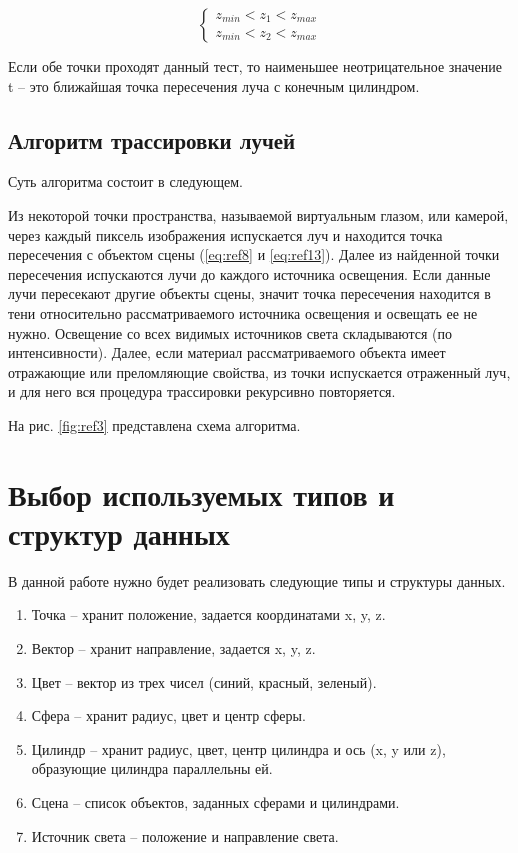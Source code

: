 \begin{equation}
	{\begin{cases}
			z_{min} < z_1 < z_{max} \\
			z_{min} < z_2 < z_{max}
			\label{eq:ref15}
		\end{cases}}
\end{equation}

Если обе точки проходят данный тест, то наименьшее неотрицательное
значение t -- это ближайшая точка пересечения луча с конечным цилиндром.

\subsection {Алгоритм трассировки лучей}

Суть алгоритма состоит в следующем.

Из некоторой точки пространства, называемой виртуальным глазом, или камерой,
через каждый пиксель изображения испускается луч и находится
точка пересечения с объектом сцены (\ref{eq:ref8} и \ref{eq:ref13}).
Далее из найденной точки пересечения испускаются лучи до каждого источника освещения.
Если данные лучи пересекают другие объекты сцены, значит точка пересечения находится
в тени относительно рассматриваемого источника освещения и освещать ее не нужно.
Освещение со всех видимых источников света складываются  (по интенсивности).
Далее, если материал рассматриваемого объекта имеет отражающие или преломляющие свойства, из точки
испускается отраженный луч, и для него вся процедура трассировки рекурсивно повторяется.

На рис. \eqref{fig:ref3} представлена схема алгоритма.

\begin{figure}[ht!]
\end{figure}

\section{Выбор используемых типов и структур данных}

В данной работе нужно будет реализовать следующие типы и структуры данных.

\begin{enumerate}
	\item Точка -- хранит положение, задается координатами x, y, z.
	\item Вектор -- хранит направление, задается x, y, z.
	\item Цвет -- вектор из трех чисел (синий, красный, зеленый).
	\item Сфера -- хранит радиус, цвет и центр сферы.
	\item Цилиндр -- хранит радиус, цвет, центр цилиндра и ось (x, y или z), образующие цилиндра параллельны ей.
	\item Сцена -- список объектов, заданных сферами и цилиндрами.
	\item Источник света -- положение и направление света.
\end{enumerate}

